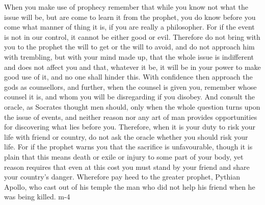 When you make use  of prophecy remember that while you know  not what the issue
will be, but are come to learn it from the prophet, you do know before you come
what manner of thing  it is, if you are really a philosopher.  For if the event
is not in our control, it cannot be either good or evil. Therefore do not bring
with you  to the  prophet the  will to  get or the  will to  avoid, and  do not
approach him with trembling,  but with your mind made up,  that the whole issue
is indifferent and does not affect you and  that, whatever it be, it will be in
your  power to  make  good  use of  it,  and no  one  shall  hinder this.  With
confidence then approach the gods as counsellors, and further, when the counsel
is given you, remember  whose counsel it is, and whom  you will be disregarding
if you  disobey. And consult the  oracle, as Socrates thought  men should, only
when the whole question turns upon the  issue of events, and neither reason nor
any art  of man provides  opportunities for  discovering what lies  before you.
Therefore, when it  is your duty to  risk your life with friend  or country, do
not ask the oracle whether you should  risk your life. For if the prophet warns
you that  the sacrifice  is unfavourable,  though it is  plain that  this means
death or exile  or injury to some  part of your body, yet  reason requires that
even  at this  cost you  must stand  by your  friend and  share your  country's
danger. Wherefore pay heed to the greater prophet, Pythian Apollo, who cast out
of his temple the man who did not help his friend when he was being killed. m-4
